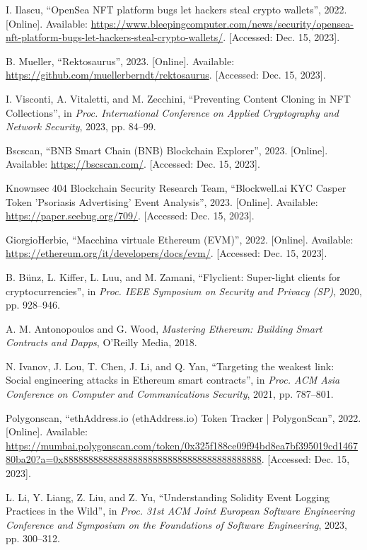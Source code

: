 \begin{thebibliography}{00}
 I. Ilascu, ``OpenSea NFT platform bugs let hackers steal crypto wallets'', 2022. [Online]. Available: \url{https://www.bleepingcomputer.com/news/security/opensea-nft-platform-bugs-let-hackers-steal-crypto-wallets/}. [Accessed: Dec. 15, 2023].

 B. Mueller, ``Rektosaurus'', 2023. [Online]. Available: \url{https://github.com/muellerberndt/rektosaurus}. [Accessed: Dec. 15, 2023].

 I. Visconti, A. Vitaletti, and M. Zecchini, ``Preventing Content Cloning in NFT Collections'', in \textit{Proc. International Conference on Applied Cryptography and Network Security}, 2023, pp. 84--99.

 Bscscan, ``BNB Smart Chain (BNB) Blockchain Explorer'', 2023. [Online]. Available: \url{https://bscscan.com/}. [Accessed: Dec. 15, 2023].

 Knownsec 404 Blockchain Security Research Team, ``Blockwell.ai KYC Casper Token 'Psoriasis Advertising' Event Analysis'', 2023. [Online]. Available: \url{https://paper.seebug.org/709/}. [Accessed: Dec. 15, 2023].

 GiorgioHerbie, ``Macchina virtuale Ethereum (EVM)'', 2022. [Online]. Available: \url{https://ethereum.org/it/developers/docs/evm/}. [Accessed: Dec. 15, 2023].

 B. B{\"u}nz, L. Kiffer, L. Luu, and M. Zamani, ``Flyclient: Super-light clients for cryptocurrencies'', in \textit{Proc. IEEE Symposium on Security and Privacy (SP)}, 2020, pp. 928--946.

 A. M. Antonopoulos and G. Wood, \textit{Mastering Ethereum: Building Smart Contracts and Dapps}, O'Reilly Media, 2018.

 N. Ivanov, J. Lou, T. Chen, J. Li, and Q. Yan, ``Targeting the weakest link: Social engineering attacks in Ethereum smart contracts'', in \textit{Proc. ACM Asia Conference on Computer and Communications Security}, 2021, pp. 787--801.

 Polygonscan, ``ethAddress.io (ethAddress.io) Token Tracker | PolygonScan'', 2022. [Online]. Available: \url{https://mumbai.polygonscan.com/token/0x325f188ce09f94bd8ea7bf395019cd146780ba20?a=0x8888888888888888888888888888888888888888}. [Accessed: Dec. 15, 2023].

 L. Li, Y. Liang, Z. Liu, and Z. Yu, ``Understanding Solidity Event Logging Practices in the Wild'', in \textit{Proc. 31st ACM Joint European Software Engineering Conference and Symposium on the Foundations of Software Engineering}, 2023, pp. 300--312.


\end{thebibliography}
